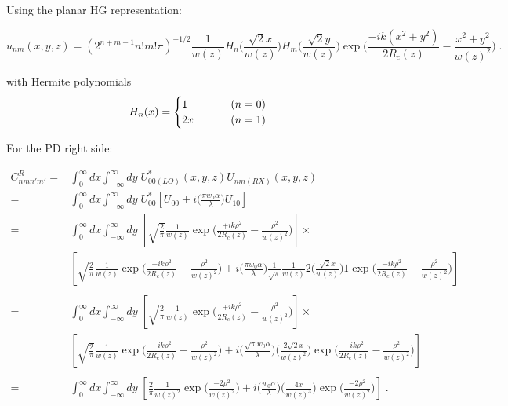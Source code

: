 \documentclass[aps,twoside,secnumarabic,balancelastpage,amsmath,amssymb,nofootinbib,hyperref=pdftex]{revtex4}
\newcommand\tab[1][3mm]{\hspace*{#1}}
\newcommand{\bigfrac}[2]{\Big( \frac{#1}{#2}\Big)}
\begin{document}
Using the planar HG representation:

\begin{equation*}
		u_{nm}(x,y,z)=(2^{n+m-1}n!m!\pi)^{-1/2}
		\frac{1}{w(z)}H_{n} \Big( \frac{\sqrt{2}x}{w(z)} \Big)
		H_{m} \Big(\frac{\sqrt{2}y}{w(z)} \Big)
		\exp \Big(\frac{-ik(x^{2}+y^{2})}{2R_{c}(z)}-
		\frac{x^{2}+y^{2}}{w(z)^{2}} \Big)\;.
\end{equation*}

with Hermite polynomials
\[
  H_{n}(x)=\begin{cases}
               1 \tab\tab\tab\tab\;\;(n=0)\\
               2x \tab\tab\tab\;\;\;(n=1)\\
            \end{cases}
\]

For the PD right side:

\begin{align*}
C_{nmn'm'}^{R} =& \int_{0}^{\infty} dx\int_{-\infty}^{\infty} dy \; U_{00(LO)}^*(x,y,z) U_{nm(RX)}(x,y,z)
\\=&\int_{0}^{\infty}dx\int_{-\infty}^{\infty}  dy \;
 U_{00}^* \left[ U_{00} + i  \bigfrac{\pi w_{0} \alpha}{\lambda}U_{10} \right]
\\=&\int_{0}^{\infty}dx\int_{-\infty}^{\infty}  dy \;
\left[
\sqrt{\frac{2}{\pi}}
		\frac{1}{w(z)}
		\exp \Big(\frac{+ik\rho^2}{2R_{c}(z)}-
		\frac{\rho^2}{w(z)^{2}} \Big) \right]
\times
\\&
\left[
\sqrt{\frac{2}{\pi}}
		\frac{1}{w(z)}
		\exp \Big(\frac{-ik \rho^2}{2R_{c}(z)}-
		\frac{\rho^2}{w(z)^{2}} \Big) 
+
i  \bigfrac{\pi w_{0} \alpha}{\lambda}
\frac{1}{\sqrt{\pi}}
		\frac{1}{w(z)} 
		2 \Big( \frac{\sqrt{2}x}{w(z)} \Big)
		1
		\exp \Big(\frac{-ik \rho^2}{2R_{c}(z)}-
		\frac{\rho^2}{w(z)^{2}} \Big)			
\right]
\\\\=&\int_{0}^{\infty}dx\int_{-\infty}^{\infty} dy \;
\left[
\sqrt{\frac{2}{\pi}}
		\frac{1}{w(z)}
		\exp \Big(\frac{+ik\rho^2}{2R_{c}(z)}-
		\frac{\rho^2}{w(z)^{2}} \Big) \right]
\times
\\&
\left[
\sqrt{\frac{2}{\pi}}
		\frac{1}{w(z)}
		\exp \Big(\frac{-ik \rho^2}{2R_{c}(z)}-
		\frac{\rho^2}{w(z)^{2}} \Big) 
+
i  \bigfrac{\sqrt{\pi} w_{0} \alpha}{\lambda}
		\Big( \frac{2 \sqrt{2}x}{w(z)^2} \Big)
		\exp \Big(\frac{-ik \rho^2}{2R_{c}(z)}-
		\frac{\rho^2}{w(z)^{2}} \Big)			
\right]
\\\\=&\int_{0}^{\infty}dx\int_{-\infty}^{\infty}  dy \;
\left[
\frac{2}{\pi}
		\frac{1}{w(z)^2}
		\exp \bigfrac{-2\rho^2}{w(z)^{2}}
+
i  \bigfrac{ w_{0} \alpha}{\lambda}
		\Big( \frac{4 x}{w(z)^3} \Big)
		\exp \bigfrac{-2 \rho^2}{w(z)^{2}}			
\right] 
\;.
\end{align*}
\end{document}
